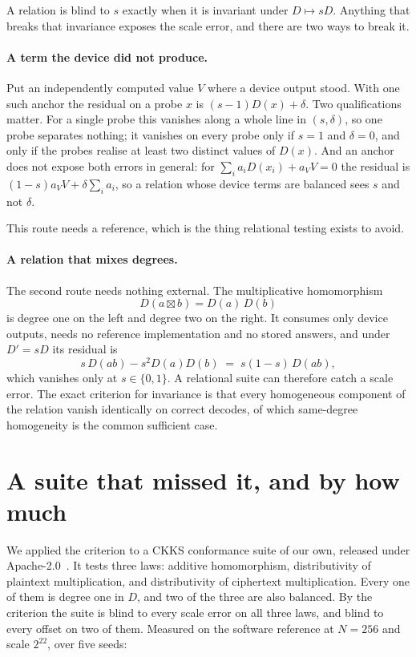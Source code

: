 \documentclass[11pt,a4paper]{article}
\begin{document}
A relation is blind to $s$ exactly when it is invariant under $D \mapsto sD$. Anything that breaks
that invariance exposes the scale error, and there are two ways to break it.

\paragraph{A term the device did not produce.} Put an independently computed value $V$ where a
device output stood. With one such anchor the residual on a probe $x$ is $(s-1)D(x) + \delta$. Two
qualifications matter. For a single probe this vanishes along a whole line in $(s, \delta)$, so one
probe separates nothing; it vanishes on every probe only if $s = 1$ and $\delta = 0$, and only if
the probes realise at least two distinct values of $D(x)$. And an anchor does not expose both errors
in general: for $\sum_i a_i D(x_i) + a_V V = 0$ the residual is $(1-s) a_V V + \delta \sum_i a_i$,
so a relation whose device terms are balanced sees $s$ and not $\delta$.

This route needs a reference, which is the thing relational testing exists to avoid.

\paragraph{A relation that mixes degrees.} The second route needs nothing external. The
multiplicative homomorphism
\[
D(a \boxtimes b) = D(a)\,D(b)
\]
is degree one on the left and degree two on the right. It consumes only device outputs, needs no
reference implementation and no stored answers, and under $D' = sD$ its residual is
\[
s\,D(ab) - s^2 D(a)D(b) \;=\; s(1-s)\,D(ab),
\]
which vanishes only at $s \in \{0, 1\}$. A relational suite can therefore catch a scale error. The
exact criterion for invariance is that every homogeneous component of the relation vanish
identically on correct decodes, of which same-degree homogeneity is the common sufficient case.

\section{A suite that missed it, and by how much}

We applied the criterion to a CKKS conformance suite of our own, released under
Apache-2.0~\cite{artifact}. It tests three laws: additive homomorphism, distributivity of plaintext
multiplication, and distributivity of ciphertext multiplication. Every one of them is degree one in
$D$, and two of the three are also balanced. By the criterion the suite is blind to every scale
error on all three laws, and blind to every offset on two of them. Measured on the software
reference at $N = 256$ and scale $2^{22}$, over five seeds:
\end{document}
